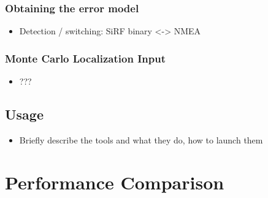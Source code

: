 \subsubsection{Obtaining the error model}
\begin{itemize}
\item Detection / switching: SiRF binary <-> NMEA
\end{itemize}

\subsubsection{Monte Carlo Localization Input}
\begin{itemize}
\item ???
\end{itemize}

\subsection{Usage}
\begin{itemize}
\item Briefly describe the tools and what they do, how to launch them
\end{itemize}

\section{Performance Comparison}
